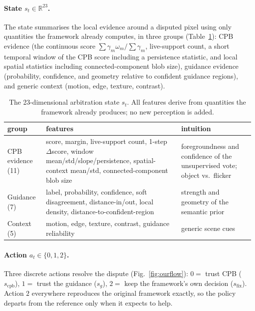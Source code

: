 \documentclass[sn-basic]{sn-jnl}
\begin{document}
\paragraph{State $s_t\in\mathbb{R}^{23}$.}
The state summarises the local evidence around a disputed pixel using only
quantities the framework already computes, in three groups (Table~\ref{tab:state}):
CPB evidence (the continuous score $\sum\gamma_m\omega_m/\sum\gamma_m$, live-support
count, a short temporal window of the CPB score including a persistence statistic,
and local spatial statistics including connected-component blob size), guidance
evidence (probability, confidence, and geometry relative to confident guidance
regions), and generic context (motion, edge, texture, contrast).

\begin{table}[t]\centering
\caption{The 23-dimensional arbitration state $s_t$. All features derive from
quantities the framework already produces; no new perception is added.}
\label{tab:state}
\small
\begin{tabular}{p{} p{} p{}}
\toprule
group & features & intuition\\
\midrule
CPB evidence (11) & score, margin, live-support count, 1-step $\Delta$score, window mean/std/slope/persistence, spatial-context mean/std, connected-component blob size & foregroundness and confidence of the unsupervised vote; object vs.\ flicker\\
Guidance (7) & label, probability, confidence, soft disagreement, distance-in/out, local density, distance-to-confident-region & strength and geometry of the semantic prior\\
Context (5) & motion, edge, texture, contrast, guidance reliability & generic scene cues\\
\bottomrule
\end{tabular}
\end{table}

\paragraph{Action $a_t\in\{0,1,2\}$.}
Three discrete actions resolve the dispute (Fig.~\ref{fig:ourflow}): $0=$ trust CPB
($s_{\text{cpb}}$), $1=$ trust the guidance ($s_g$), $2=$ keep the framework's own
decision ($s_{\text{fix}}$). Action $2$ everywhere reproduces the original framework
exactly, so the policy departs from the reference only when it expects to help.
\end{document}
